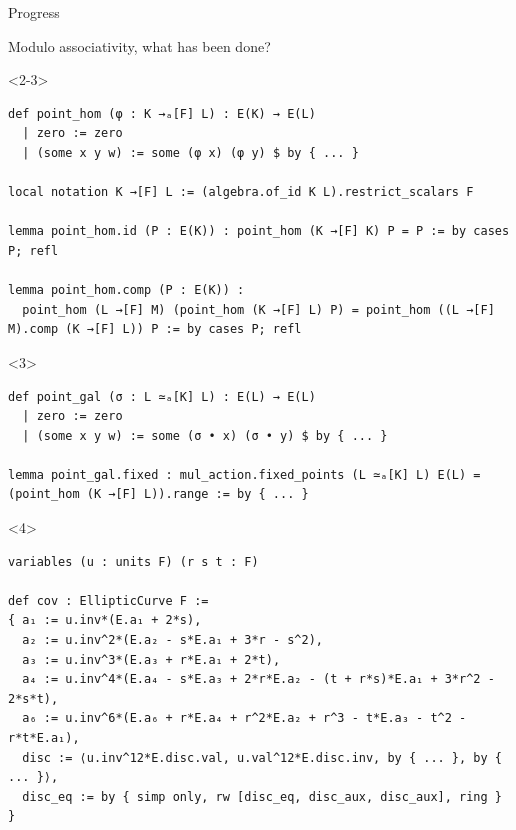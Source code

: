 \documentclass[10pt]{beamer}
\begin{document}
\begin{frame}[fragile, t]{Progress}

Modulo associativity, what has been done?


\begin{onlyenv}<2-3>
\begin{lstlisting}[basicstyle=\tiny, frame=single]
def point_hom (φ : K →ₐ[F] L) : E(K) → E(L)
  | zero := zero
  | (some x y w) := some (φ x) (φ y) $ by { ... }

local notation K →[F] L := (algebra.of_id K L).restrict_scalars F

lemma point_hom.id (P : E(K)) : point_hom (K →[F] K) P = P := by cases P; refl

lemma point_hom.comp (P : E(K)) :
  point_hom (L →[F] M) (point_hom (K →[F] L) P) = point_hom ((L →[F] M).comp (K →[F] L)) P := by cases P; refl
\end{lstlisting}
\end{onlyenv}


\begin{onlyenv}<3>
\begin{lstlisting}[basicstyle=\tiny, frame=single]
def point_gal (σ : L ≃ₐ[K] L) : E(L) → E(L)
  | zero := zero
  | (some x y w) := some (σ • x) (σ • y) $ by { ... }

lemma point_gal.fixed : mul_action.fixed_points (L ≃ₐ[K] L) E(L) = (point_hom (K →[F] L)).range := by { ... }
\end{lstlisting}
\end{onlyenv}


\begin{onlyenv}<4>
\begin{lstlisting}[basicstyle=\tiny, frame=single]
variables (u : units F) (r s t : F)

def cov : EllipticCurve F :=
{ a₁ := u.inv*(E.a₁ + 2*s),
  a₂ := u.inv^2*(E.a₂ - s*E.a₁ + 3*r - s^2),
  a₃ := u.inv^3*(E.a₃ + r*E.a₁ + 2*t),
  a₄ := u.inv^4*(E.a₄ - s*E.a₃ + 2*r*E.a₂ - (t + r*s)*E.a₁ + 3*r^2 - 2*s*t),
  a₆ := u.inv^6*(E.a₆ + r*E.a₄ + r^2*E.a₂ + r^3 - t*E.a₃ - t^2 - r*t*E.a₁),
  disc := ⟨u.inv^12*E.disc.val, u.val^12*E.disc.inv, by { ... }, by { ... }⟩,
  disc_eq := by { simp only, rw [disc_eq, disc_aux, disc_aux], ring } }


\end{lstlisting}
\end{onlyenv}
\end{frame}
\end{document}
